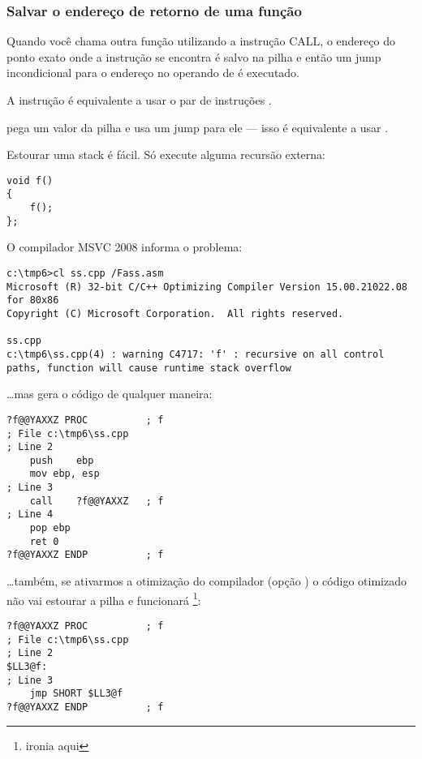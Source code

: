 \subsubsection{Salvar o endereço de retorno de uma função}


Quando você chama outra função utilizando a instrução CALL, o endereço do ponto exato onde a 
instrução \CALL se encontra é salvo na pilha e então um jump incondicional para o endereço no operando de \CALL é executado.

A instrução \CALL é equivalente a usar o par de instruções .

\RET pega um valor da pilha e usa um jump para ele --- isso é equivalente a usar .

\myindex{\Stack!\MLStackOverflow}
\myindex{\Recursion}
Estourar uma stack é fácil. Só execute alguma recursão externa:

\begin{lstlisting}[style=customc]
void f()
{
	f();
};
\end{lstlisting}

O compilador MSVC 2008 informa o problema:

\begin{lstlisting}
c:\tmp6>cl ss.cpp /Fass.asm
Microsoft (R) 32-bit C/C++ Optimizing Compiler Version 15.00.21022.08 for 80x86
Copyright (C) Microsoft Corporation.  All rights reserved.

ss.cpp
c:\tmp6\ss.cpp(4) : warning C4717: 'f' : recursive on all control paths, function will cause runtime stack overflow
\end{lstlisting}

\dots mas gera o código de qualquer maneira:

\begin{lstlisting}[style=customasmx86]
?f@@YAXXZ PROC			; f
; File c:\tmp6\ss.cpp
; Line 2
	push	ebp
	mov	ebp, esp
; Line 3
	call	?f@@YAXXZ	; f
; Line 4
	pop	ebp
	ret	0
?f@@YAXXZ ENDP			; f
\end{lstlisting}

\dots também, se ativarmos a otimização do compilador (opção ) 
o código otimizado não vai estourar a pilha e funcionará  \footnote{ironia aqui}:

\begin{lstlisting}[style=customasmx86]
?f@@YAXXZ PROC			; f
; File c:\tmp6\ss.cpp
; Line 2
$LL3@f:
; Line 3
	jmp	SHORT $LL3@f
?f@@YAXXZ ENDP			; f
\end{lstlisting}

\PTBRph{}

